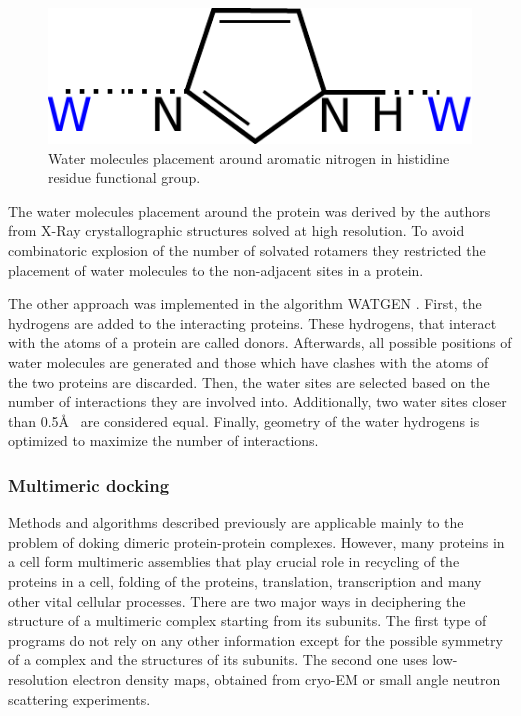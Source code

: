 \begin{figure}[H]
    \begin{centering}
      \includegraphics[width=0.4\linewidth]{Intro/Fig/SolvatedRotamer}  
      \caption{Water molecules placement around aromatic nitrogen in histidine residue functional group.}
      \label{Fig:SolvatedRotamer}
    \end{centering}
\end{figure}
The water molecules placement around the protein was derived by the authors from X-Ray crystallographic structures solved at high resolution. To avoid combinatoric explosion of
the number of solvated rotamers they restricted the placement of water molecules to the non-adjacent sites in a protein.

The other approach was implemented in the algorithm WATGEN \cite{bui2007watgen}. First, the hydrogens are added to the interacting proteins. These hydrogens, that interact with 
the atoms of a protein are called donors. Afterwards, all possible positions of water molecules are generated and those which have clashes with the atoms of the two proteins are
discarded. Then, the water sites are selected based on the number of interactions they are involved into. Additionally, two water sites closer than 0.5\AA~ are considered equal.
Finally, geometry of the water hydrogens is optimized to maximize the number of interactions.



\subsubsection{Multimeric docking}
Methods and algorithms described previously are applicable mainly to the problem of doking dimeric protein-protein complexes. However, 
many proteins in a cell form multimeric assemblies that play crucial role in recycling of the proteins in a cell, folding of the proteins, translation, transcription and many other 
vital cellular processes. There are two major ways in deciphering the structure of a multimeric complex starting from its subunits. The first type of programs
do not rely on any other information except for the possible symmetry of a complex and the structures of its subunits. The second one uses low-resolution
electron density maps, obtained from cryo-EM or small angle neutron scattering experiments.

